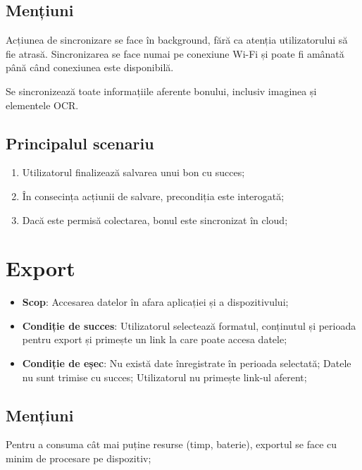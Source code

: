\subsection{Mențiuni}\label{menux21biuni-2}

Acțiunea de sincronizare se face în background, fără ca atenția utilizatorului să fie atrasă. Sincronizarea se face numai pe conexiune Wi-Fi și poate fi amânată până când conexiunea este disponibilă.

Se sincronizează toate informațiile aferente bonului, inclusiv imaginea și elementele OCR.

\subsection{Principalul scenariu}\label{principalul-scenariu-3}

\begin{enumerate}
\item
  Utilizatorul finalizează salvarea unui bon cu succes;
\item
  În consecința acțiunii de salvare, precondiția este interogată;
\item
  Dacă este permisă colectarea, bonul este sincronizat în cloud;
\end{enumerate}

\section{Export}\label{export}

\begin{itemize}
\item
  \textbf{Scop}: Accesarea datelor în afara aplicației și a dispozitivului;
\item
  \textbf{Condiție de succes}: Utilizatorul selectează formatul, conținutul și perioada pentru export și primește un link la care poate accesa datele;
\item
  \textbf{Condiție de eșec}: Nu există date înregistrate în perioada selectată; Datele nu sunt trimise cu succes; Utilizatorul nu primește link-ul aferent;
\end{itemize}

\subsection{Mențiuni}\label{menux21biuni-3}

Pentru a consuma cât mai puține resurse (timp, baterie), exportul se face cu minim de procesare pe dispozitiv;


